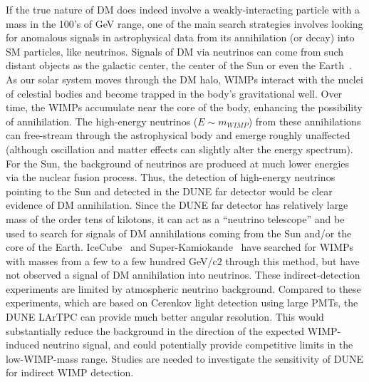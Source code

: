 If the true nature of DM does indeed involve a weakly-interacting particle with a mass in the 100's of GeV range, one of the main search strategies involves looking for anomalous signals in astrophysical data from its annihilation (or decay) into SM particles, like neutrinos. Signals of DM via neutrinos can come from such distant objects as the galactic center, the center of the Sun or even the Earth~\cite{Press:1985ug,Silk:1985ax,Gaisser:1986ha,Gould:1987ir,Cirelli:2005gh}. As our solar system moves through the DM halo, WIMPs interact with the nuclei of celestial bodies and become trapped in the body's gravitational well.  Over time, the WIMPs accumulate near the core of the body, enhancing the possibility of annihilation. The high-energy neutrinos ($E\sim m_{WIMP}$) from these annihilations can free-stream through the astrophysical body and emerge roughly unaffected (although oscillation and matter effects can slightly alter the energy spectrum).  For the Sun, the background of neutrinos are produced at much lower energies via the nuclear fusion process. Thus, the detection of high-energy neutrinos pointing to the Sun and detected in the DUNE far detector would be clear evidence of DM annihilation.  Since the DUNE far detector has relatively large mass of the order tens of kilotons, it can act as a ``neutrino telescope'' and be used to search for signals of DM annihilations coming from the Sun and/or the core of the Earth. IceCube~\cite{Aartsen:2012kia} and Super-Kamiokande~\cite{Choi:2015ara} have searched for WIMPs with masses from a few to a few hundred GeV/c$2$ through this method, but have not observed a signal of DM annihilation into neutrinos.  These indirect-detection experiments  are limited by atmospheric neutrino background.  Compared to these experiments, which are based on Cerenkov light detection using large PMTs, the DUNE LArTPC can provide much better angular resolution. This would substantially reduce the background in the direction of the  expected WIMP-induced neutrino signal, and could potentially provide competitive limits in the low-WIMP-mass range.  Studies are needed to investigate the sensitivity of DUNE for indirect WIMP detection.

